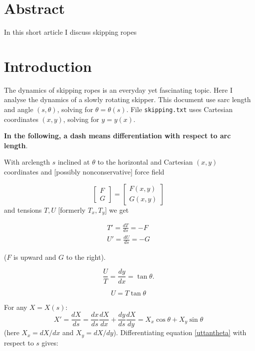 \documentclass{article}
\begin{document}
\newcommand{\jj}{\sqrt{1+\left(y'\right)^2}}
\section*{Abstract}
In this short article I discuss skipping ropes

\section{Introduction}

The dynamics of skipping ropes is an everyday yet fascinating topic.
Here I analyse the dynamics of a slowly rotating skipper.  This
document use sarc length and angle $(s,\theta)$, solving for
$\theta=\theta(s)$.  File {\tt skipping.txt} uses Cartesian
coordinates $(x,y)$, solving for $y=y(x)$.

\citep{mohazzabi1999}

{\bf\large In the following, a dash means differentiation with respect
  to arc length}.


With arclength $s$ inclined at $\theta$ to the horizontal and
Cartesian $(x,y)$ coordinates and [possibly nonconservative] force
field

\begin{equation}
  \begin{bmatrix}F\\G\end{bmatrix}
    =
    \begin{bmatrix}F(x,y)\\G(x,y)\end{bmatrix}
\end{equation}
and tensions $T,U$ [formerly $T_x,T_y$] we get

\begin{eqnarray}
T'=  \frac{dT}{ds}=-F\label{Tx}\\
U'=  \frac{dU}{ds}=-G\label{Ty}
  \end{eqnarray}

($F$ is upward and $G$ to the right).

\begin{equation}
  \frac{U}{T}=\frac{dy}{dx}=\tan\theta.
\end{equation}


\begin{equation}
U=T\tan\theta\label{uttantheta}
\end{equation}

For any $X=X(s)$:
\begin{equation}
X'=\frac{dX}{ds}=\frac{dx}{ds}\frac{dX}{dx}+\frac{dy}{ds}\frac{dX}{dy}=X_x\cos\theta + X_y\sin\theta
\end{equation}
(here $X_x=dX/dx$ and $X_y=dX/dy$).  Differentiating equation
\ref{uttantheta} with respect to $s$ gives:
\end{document}
